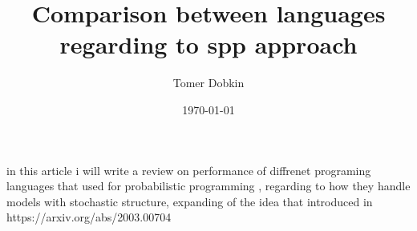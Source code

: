 \documentclass{article}
\title{Comparison between languages regarding to spp approach}
\author{Tomer Dobkin}
\date{\today}
\begin{document}
\maketitle
in this article i will write a review on performance of diffrenet programing languages that used for probabilistic programming , regarding to how they handle models with stochastic structure, expanding of the idea that introduced in https://arxiv.org/abs/2003.00704
\end{document}
